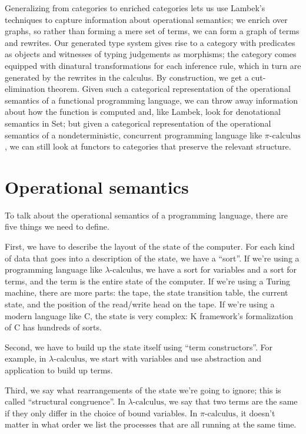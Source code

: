 \documentclass[a4paper,UKenglish]{article}
\newcommand{\pic}{$\pi\mbox{-calculus}$\xspace}
\newcommand{\lac}{$\lambda\mbox{-calculus}$\xspace}
\begin{document}
Generalizing from categories to enriched categories lets us use Lambek's techniques to capture information about operational semantics; we enrich over graphs, so rather than forming a mere set of terms, we can form a graph of terms and rewrites.  Our generated type system gives rise to a category with predicates as objects and witnesses of typing judgements as morphisms; the category comes equipped with dinatural transformations for each inference rule, which in turn are generated by the rewrites in the calculus.  By construction, we get a cut-elimination theorem.  Given such a categorical representation of the operational semantics of a functional programming language, we can throw away information about how the function is computed and, like Lambek, look for denotational semantics in Set; but given a categorical representation of the operational semantics of a nondeterministic, concurrent programming language like \pic, we can still look at functors to categories that preserve the relevant structure.

\section {Operational semantics}

To talk about the operational semantics of a programming language, there are five things we need to define.

First, we have to describe the layout of the state of the computer. For each kind of data that goes into a description of the state, we have a ``sort''.  If we're using a programming language like \lac, we have a sort for variables and a sort for terms, and the term is the entire state of the computer.  If we're using a Turing machine, there are more parts: the tape, the state transition table, the current state, and the position of the read/write head on the tape.  If we're using a modern language like C, the state is very complex: K framework's formalization of C has hundreds of sorts.

Second, we have to build up the state itself using ``term constructors''.  For example, in \lac, we start with variables and use abstraction and application to build up terms.

Third, we say what rearrangements of the state we're going to ignore; this is called ``structural congruence''.  In \lac, we say that two terms are the same if they only differ in the choice of bound variables.  In \pic, it doesn't matter in what order we list the processes that are all running at the same time.
\end{document}
